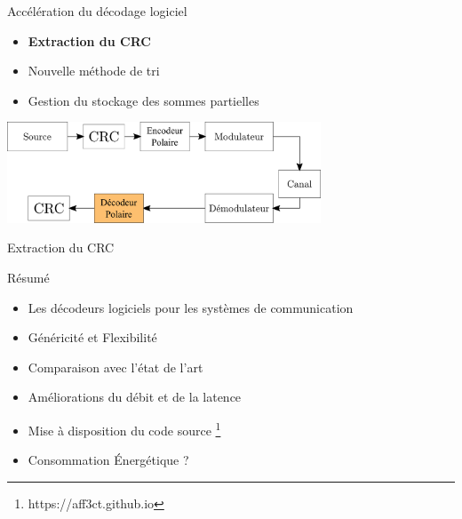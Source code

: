 \begin{frame}[c]{Accélération du décodage logiciel}
  \only<+>
  {
	\begin{itemize}
		\vfill
		\item \textbf{Extraction du CRC}
		\vfill
		\item Nouvelle méthode de tri
		\vfill
		\item Gestion du stockage des sommes partielles
		\vfill
	\end{itemize}
  }
\end{frame}


\begin{frame}
\vfill
\centering
  \includegraphics[width=0.7\textwidth]{./fig/extract-1}
  \vfill
\end{frame}

\begin{frame}[c]{Extraction du CRC}
	\centering
\end{frame}

\begin{frame}[c]{Résumé}
	\begin{itemize}
		\vfill
		\item Les décodeurs logiciels pour les systèmes de communication
		\vfill
		\item Généricité et Flexibilité
		\vfill
		\item Comparaison avec l'état de l'art
		\vfill
		\item Améliorations du débit et de la latence
		\vfill
    \item Mise à disposition du code source \footnote{https://aff3ct.github.io}
    \vfill
		\item Consommation \'Energétique ?
		\vfill
	\end{itemize}
\end{frame}

